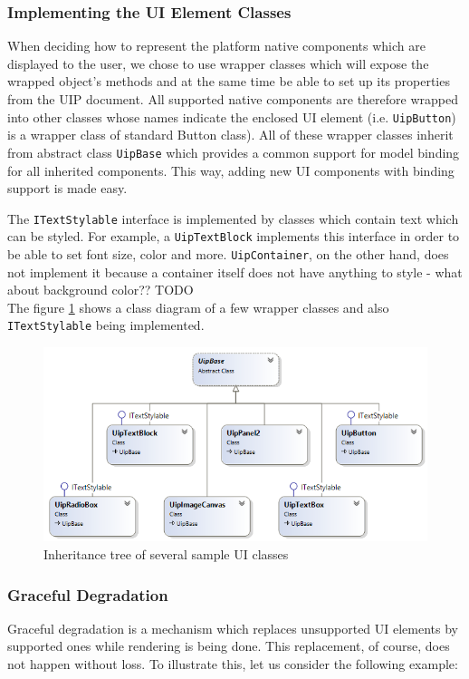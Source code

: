 \subsubsection{Implementing the UI Element Classes}
When deciding how to represent the platform native components which are displayed to the user, we chose to use wrapper classes which will expose the wrapped object's methods and at the same time be able to set up its properties from the UIP document. All supported native components are therefore wrapped into other classes whose names indicate the enclosed UI element (i.e. \texttt{UipButton}) is a wrapper class of standard Button class). All of these wrapper classes inherit from abstract class \texttt{UipBase} which provides a common support for model binding for all inherited components. This way, adding new UI components with binding support is made easy.

The \texttt{ITextStylable} interface is implemented by classes which contain text which can be styled. For example, a \texttt{UipTextBlock} implements this interface in order to be able to set font size, color and more. \texttt{UipContainer}, on the other hand, does not implement it because a container itself does not have anything to style - what about background color?? TODO\\
The figure \ref{fig:UIclasses} shows a class diagram of a few wrapper classes and also \texttt{ITextStylable} being implemented.

\begin{figure}[ht!]
\centering
\includegraphics[width=140mm]{pics/UI_classes.png}
\caption{Inheritance tree of several sample UI classes}
\label{fig:UIclasses}
\end{figure}

\subsubsection{Graceful Degradation}
Graceful degradation is a mechanism which replaces unsupported UI elements by supported ones while rendering is being done. This replacement, of course, does not happen without loss. To illustrate this, let us consider the following example:

